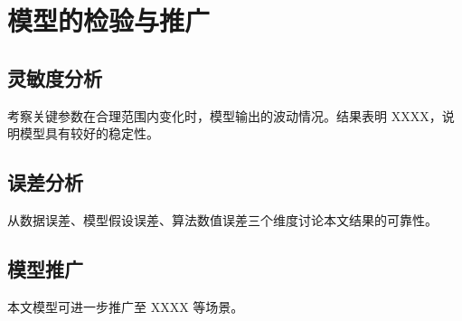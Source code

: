 \section{模型的检验与推广}

\subsection{灵敏度分析}
考察关键参数在合理范围内变化时，模型输出的波动情况。结果表明 XXXX，说明模型具有较好的稳定性。

\subsection{误差分析}
从数据误差、模型假设误差、算法数值误差三个维度讨论本文结果的可靠性。

\subsection{模型推广}
本文模型可进一步推广至 XXXX 等场景。
